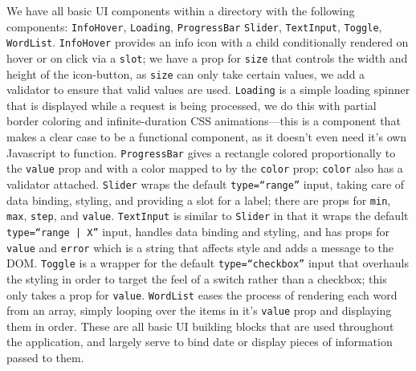\documentclass[11pt, twoside, reqno]{book}
\begin{document}
We have all basic UI components within a directory with the following components: \texttt{InfoHover}, \texttt{Loading}, \texttt{ProgressBar} \texttt{Slider}, \texttt{TextInput}, \texttt{Toggle}, \texttt{WordList}. \texttt{InfoHover} provides an info icon with a child conditionally rendered on hover or on click via a \texttt{slot}; we have a prop for \texttt{size} that controls the width and height of the icon-button, as \texttt{size} can only take certain values, we add a validator to ensure that valid values are used. \texttt{Loading} is a simple loading spinner that is displayed while a request is being processed, we do this with partial border coloring and infinite-duration CSS animations—this is a component that makes a clear case to be a functional component, as it doesn't even need it's own Javascript to function. \texttt{ProgressBar} gives a rectangle colored proportionally to the \texttt{value} prop and with a color mapped to by the \texttt{color} prop; \texttt{color} also has a validator attached. \texttt{Slider} wraps the default \texttt{type=``range''} input, taking care of data binding, styling, and providing a slot for a label; there are props for \texttt{min}, \texttt{max}, \texttt{step}, and \texttt{value}. \texttt{TextInput} is similar to \texttt{Slider} in that it wraps the default \texttt{type=``range | X''} input, handles data binding and styling, and has props for \texttt{value} and \texttt{error} which is a string that affects style and adds a message to the DOM. \texttt{Toggle} is a wrapper for the default \texttt{type=``checkbox''} input that overhauls the styling in order to target the feel of a switch rather than a checkbox; this only takes a prop for \texttt{value}. \texttt{WordList} eases the process of rendering each word from an array, simply looping over the items in it's \texttt{value} prop and displaying them in order. These are all basic UI building blocks that are used throughout the application, and largely serve to bind date or display pieces of information passed to them.
\end{document}
